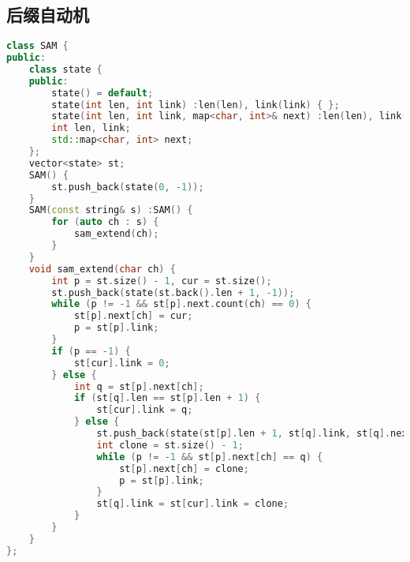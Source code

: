 \subsection{后缀自动机}
\begin{lstlisting}[language=c++]
class SAM {
public:
    class state {
    public:
        state() = default;
        state(int len, int link) :len(len), link(link) { };
        state(int len, int link, map<char, int>& next) :len(len), link(link), next(next) { };
        int len, link;
        std::map<char, int> next;
    };
    vector<state> st;
    SAM() {
        st.push_back(state(0, -1));
    }
    SAM(const string& s) :SAM() {
        for (auto ch : s) {
            sam_extend(ch);
        }
    }
    void sam_extend(char ch) {
        int p = st.size() - 1, cur = st.size();
        st.push_back(state(st.back().len + 1, -1));
        while (p != -1 && st[p].next.count(ch) == 0) {
            st[p].next[ch] = cur;
            p = st[p].link;
        }
        if (p == -1) {
            st[cur].link = 0;
        } else {
            int q = st[p].next[ch];
            if (st[q].len == st[p].len + 1) {
                st[cur].link = q;
            } else {
                st.push_back(state(st[p].len + 1, st[q].link, st[q].next));
                int clone = st.size() - 1;
                while (p != -1 && st[p].next[ch] == q) {
                    st[p].next[ch] = clone;
                    p = st[p].link;
                }
                st[q].link = st[cur].link = clone;
            }
        }
    }
};
\end{lstlisting}
